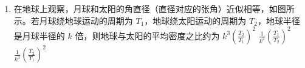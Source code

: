\documentclass[\gkver]{gaokaozhenti}
\begin{document}
\begin{enumerate}
{	B．因②对应的能级差小于④对应的能级差，可知②的能量小于④的能量，根据 $E = h\nu$ 可知②的频率小于④的频率，选项 B 错误；

	C．因②对应的能级差小于①对应的能级差，可知②的能量小于①，②的频率小于①，则若用①照射某金属表面时能发生光电效应，用②照射该金属不一定能发生光电效应，选项 C 错误；

	D．因④对应的能级差大于①对应的能级差，可知④的能量大于①，即④的频率大于①，因用①照射某金属表面时能逸出光电子的最大初动能为 $E_{k}$，根据 $E_{km} = h\nu - W_{\text{逸出功}}$，则用④照射该金属逸出光电子的最大初动能大于 $E_{k}$，选项 D 错误。

	故选 A。
}

\item
在地球上观察，月球和太阳的角直径（直径对应的张角）近似相等，如图所示。若月球绕地球运动的周期为 $T_{1}$，地球绕太阳运动的周期为 $T_{2}$，地球半径是月球半径的 $k$ 倍，则地球与太阳的平均密度之比约为
{$k^{3}\left(\frac{T_{2}}{T_{1}}\right)^{2}$}
{$\frac{1}{k^{3}}\left(\frac{T_{1}}{T_{2}}\right)^{2}$}
{$\frac{1}{k^{3}}\left(\frac{T_{2}}{T_{1}}\right)^{2}$}


\end{enumerate}
\end{document}
